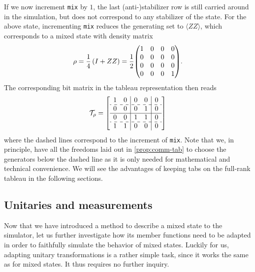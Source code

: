 If we now increment \verb|mix| by $1$, the last (anti-)stabilizer row is still
carried around in the simulation, but does not correspond to any stabilizer of
the state. For the above state, incrementing \verb|mix| reduces the generating
set to $\langle ZZ \rangle$, which corresponds to a mixed state with density
matrix
\begin{align}\label{eq:sample-mixedstate}
  \rho = \frac{1}{4}\left( I + ZZ \right) = \frac{1}{2}\mqty(\dmat[0]{1,0,0,1})
.\end{align}
The corresponding bit matrix in the tableau representation then reads
\begin{align}
\mathcal{T}_{\rho} = 
  \left[
    \begin{array}{cc|cc|c}
      1 & 0 & 0 & 0 & 0 \\ \hdashline
      0 & 0 & 0 & 1 & 0 \\ \hline
      0 & 0 & 1 & 1 & 0 \\ \hdashline
      1 & 1 & 0 & 0 & 0 \\ 
    \end{array}
  \right]
\end{align}
where the dashed lines correspond to the increment of \verb|mix|. Note that we,
in principle, have all the freedoms laid out in \cref{prop:comm-tab} to choose
the generators below the dashed line as it is only needed for mathematical and
technical convenience. We will see the advantages of keeping tabs on the
full-rank tableau in the following sections.
\subsection{Unitaries and measurements}
Now that we have introduced a method to describe a mixed state to the
simulator, let us further investigate how its member functions need to be
adapted in order to faithfully simulate the behavior of mixed states. Luckily
for us, adapting unitary transformations is a rather simple task, since it
works the same as for mixed states. It thus requires no further inquiry. 

